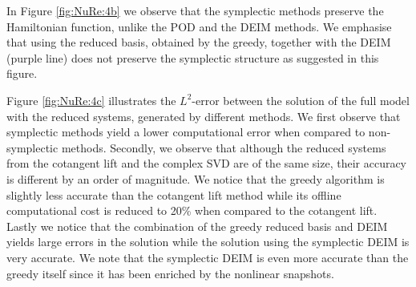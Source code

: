 \documentclass[final]{siamart}
\begin{document}
{{\color{black}} In Figure \ref{fig:NuRe:4b} we observe that the symplectic methods preserve the Hamiltonian function, unlike the POD and the DEIM methods. We emphasise that using the reduced basis, obtained by the greedy, together with the DEIM (purple line) does not preserve the symplectic structure as suggested in this figure.}

Figure \ref{fig:NuRe:4c} illustrates the $L^2$-error between the solution of the full model with the reduced systems, generated by different methods. We first observe that symplectic methods yield a lower computational error {{\color{black}} when} compared to non-symplectic methods. Secondly, we observe that although the reduced systems from the cotangent lift and the complex SVD are of the same size, their accuracy is different by an order of magnitude. We notice that the greedy algorithm is slightly less accurate than the cotangent lift method while its offline computational cost is reduced to 20\% {{\color{black}} when compared to the cotangent lift}. Lastly we notice that the combination of the greedy reduced basis and DEIM yields large errors in the solution while the solution using the symplectic DEIM is very accurate. We note that the symplectic DEIM is even more accurate than the greedy itself since it has been enriched by the nonlinear snapshots. 
\end{document}
